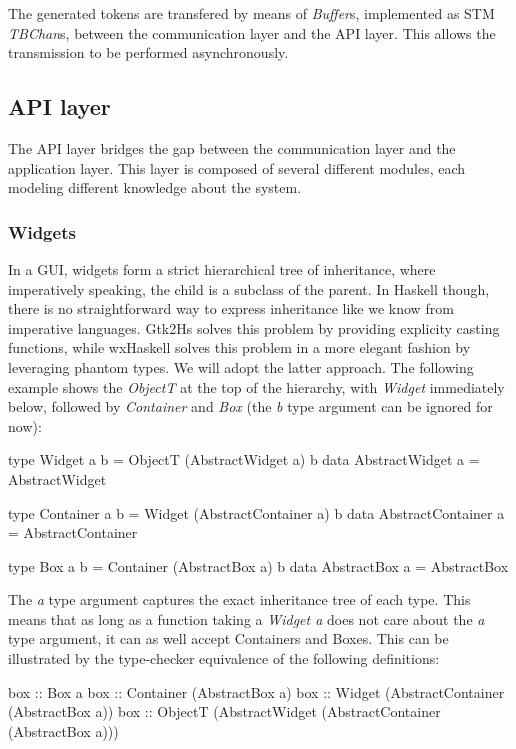 \documentclass[11pt,a4paper]{article}
\begin{document}
The generated tokens are transfered by means of \textit{Buffer}s, implemented as STM \textit{TBChan}s, between the communication layer and the API layer.
This allows the transmission to be performed asynchronously.

\subsection{API layer}
The API layer bridges the gap between the communication layer and the application layer.
This layer is composed of several different modules, each modeling different knowledge about the system.

\subsubsection{Widgets}
In a GUI, widgets form a strict hierarchical tree of inheritance, where imperatively speaking, the child is a subclass of the parent.
In Haskell though, there is no straightforward way to express inheritance like we know from imperative languages.
Gtk2Hs solves this problem by providing explicity casting functions, while wxHaskell solves this problem in a more elegant fashion by leveraging phantom types.
We will adopt the latter approach.
The following example shows the \textit{ObjectT} at the top of the hierarchy, with \textit{Widget} immediately below, followed by \textit{Container} and \textit{Box} (the \textit{b} type argument can be ignored for now):
\begin{haskell}
type Widget a b = ObjectT (AbstractWidget a) b
data AbstractWidget a = AbstractWidget

type Container a b = Widget (AbstractContainer a) b
data AbstractContainer a = AbstractContainer

type Box a b = Container (AbstractBox a) b
data AbstractBox a = AbstractBox
\end{haskell}

The \textit{a} type argument captures the exact inheritance tree of each type.
This means that as long as a function taking a \textit{Widget a} does not care about the \textit{a} type argument, it can as well accept Containers and Boxes.
This can be illustrated by the type-checker equivalence of the following definitions:
\begin{haskell}
box :: Box a
box :: Container (AbstractBox a)
box :: Widget (AbstractContainer (AbstractBox a))
box :: ObjectT (AbstractWidget (AbstractContainer (AbstractBox a)))
\end{haskell}
\end{document}
